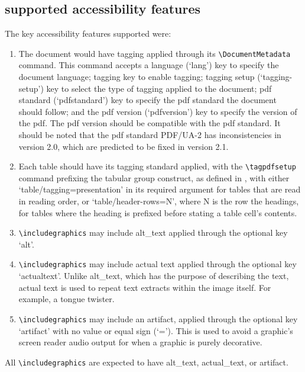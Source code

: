 \subsection{\lintexspaced supported accessibility features}\label{specification_design:supported_accessibility}
The key \latexspaced accessibility features supported were:
\begin{enumerate}
\item[\textbf{Document tagging}] The document would have tagging applied through its \verb|\DocumentMetadata| command. This command accepts a language (`lang') key to specify the document language; tagging key to enable tagging; tagging setup (`tagging-setup') key to select the type of tagging applied to the \latexspaced document; \acrshort{pdf} standard (`pdfstandard') key to specify the \acrshort{pdf} standard the document should follow; and the \acrshort{pdf} version (`pdfversion') key to specify the version of the \acrshort{pdf}. The \acrshort{pdf} version should be compatible with the \acrshort{pdf} standard. It should be noted that the \acrshort{pdf} standard PDF/UA-2 has inconsistencies in version 2.0, which are predicted to be fixed in version 2.1.
\item[\textbf{Table tagging}] Each table should have its tagging standard applied, with the \verb|\tagpdfsetup| command prefixing the tabular group construct, as defined in , with either `table/tagging=presentation' in its required argument for tables that are read in reading order, or `table/header-rows={N}', where N is the row the headings, for tables where the heading is prefixed before stating a table cell's contents.
\item[\textbf{\Gls{alt_text}}] \verb|\includegraphics| may include \gls{alt_text} applied through the optional key `alt'.
\item[\textbf{Actual text}] \verb|\includegraphics| may include actual text applied through the optional key `actualtext'. Unlike \gls{alt_text}, which has the purpose of describing the text, actual text is used to repeat text extracts within the image itself. For example, a tongue twister.
\item[\textbf{\Gls{artifact}}] \verb|\includegraphics| may include an artifact, applied through the optional key `artifact' with no value or equal sign (`='). This is used to avoid a graphic's screen reader audio output for when a graphic is purely decorative.
\end{enumerate}
All \verb|\includegraphics| are expected to have \gls{alt_text}, \gls{actual_text}, or \gls{artifact}.

